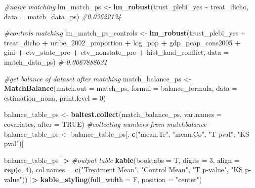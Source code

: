 \documentclass[
]{article}
\newenvironment{Shaded}{\begin{snugshade}}{\end{snugshade}}
\newcommand{\AttributeTok}[1]{\textcolor[rgb]{0.13,0.29,0.53}{#1}}
\newcommand{\CommentTok}[1]{\textcolor[rgb]{0.56,0.35,0.01}{\textit{#1}}}
\newcommand{\ConstantTok}[1]{\textcolor[rgb]{0.56,0.35,0.01}{#1}}
\newcommand{\DecValTok}[1]{\textcolor[rgb]{0.00,0.00,0.81}{#1}}
\newcommand{\FunctionTok}[1]{\textcolor[rgb]{0.13,0.29,0.53}{\textbf{#1}}}
\newcommand{\NormalTok}[1]{#1}
\newcommand{\OtherTok}[1]{\textcolor[rgb]{0.56,0.35,0.01}{#1}}
\newcommand{\SpecialCharTok}[1]{\textcolor[rgb]{0.81,0.36,0.00}{\textbf{#1}}}
\newcommand{\StringTok}[1]{\textcolor[rgb]{0.31,0.60,0.02}{#1}}
\begin{document}
\begin{Shaded}
\begin{Highlighting}[]
\CommentTok{\#naive matching}
\NormalTok{lm\_match\_ps }\OtherTok{\textless{}{-}} \FunctionTok{lm\_robust}\NormalTok{(trust\_plebi\_yes }\SpecialCharTok{\textasciitilde{}}\NormalTok{ treat\_dicho, }\AttributeTok{data =}\NormalTok{ match\_data\_ps) }\CommentTok{\#0.03622134}

\CommentTok{\#controls matching}
\NormalTok{lm\_match\_ps\_controls }\OtherTok{\textless{}{-}} \FunctionTok{lm\_robust}\NormalTok{(trust\_plebi\_yes }\SpecialCharTok{\textasciitilde{}}\NormalTok{ treat\_dicho }\SpecialCharTok{+}\NormalTok{ uribe\_2002\_proportion }\SpecialCharTok{+}\NormalTok{ log\_pop }\SpecialCharTok{+}\NormalTok{ gdp\_pcap\_cons2005 }\SpecialCharTok{+}\NormalTok{  gini }\SpecialCharTok{+}\NormalTok{ etv\_state\_pre }\SpecialCharTok{+}\NormalTok{ etv\_nonstate\_pre }\SpecialCharTok{+}\NormalTok{ hist\_land\_conflict, }\AttributeTok{data =}\NormalTok{ match\_data\_ps) }\CommentTok{\#{-}0.0067888631}
\end{Highlighting}
\end{Shaded}

\begin{Shaded}
\begin{Highlighting}[]
\CommentTok{\#get balance of dataset after matching}
\NormalTok{match\_balance\_ps }\OtherTok{\textless{}{-}} \FunctionTok{MatchBalance}\NormalTok{(}\AttributeTok{match.out =}\NormalTok{ match\_ps, }
                                 \AttributeTok{formul =}\NormalTok{ balance\_formula, }
                                 \AttributeTok{data =}\NormalTok{ estimation\_nona, }
                                 \AttributeTok{print.level =} \DecValTok{0}\NormalTok{)}

\NormalTok{balance\_table\_ps }\OtherTok{\textless{}{-}} \FunctionTok{baltest.collect}\NormalTok{(match\_balance\_ps, }\AttributeTok{var.names =}\NormalTok{ covariates, }\AttributeTok{after =} \ConstantTok{TRUE}\NormalTok{) }\CommentTok{\#collecting numbers from matchbalance}
\NormalTok{balance\_table\_ps }\OtherTok{\textless{}{-}}\NormalTok{ balance\_table\_ps[, }\FunctionTok{c}\NormalTok{(}\StringTok{"mean.Tr"}\NormalTok{, }\StringTok{"mean.Co"}\NormalTok{, }\StringTok{"T pval"}\NormalTok{, }\StringTok{"KS pval"}\NormalTok{)]}

\NormalTok{balance\_table\_ps }\SpecialCharTok{|\textgreater{}} \CommentTok{\#output table}
  \FunctionTok{kable}\NormalTok{(}\AttributeTok{booktabs =}\NormalTok{ T, }\AttributeTok{digits =} \DecValTok{3}\NormalTok{, }\AttributeTok{align =} \FunctionTok{rep}\NormalTok{(}\StringTok{\textquotesingle{}c\textquotesingle{}}\NormalTok{, }\DecValTok{4}\NormalTok{),}
        \AttributeTok{col.names =} \FunctionTok{c}\NormalTok{(}\StringTok{"Treatment Mean"}\NormalTok{, }\StringTok{"Control Mean"}\NormalTok{, }\StringTok{"T p{-}value"}\NormalTok{, }\StringTok{"KS p{-}value"}\NormalTok{)) }\SpecialCharTok{|\textgreater{}} 
  \FunctionTok{kable\_styling}\NormalTok{(}\AttributeTok{full\_width =}\NormalTok{ F, }\AttributeTok{position =} \StringTok{"center"}\NormalTok{)}
\end{Highlighting}
\end{Shaded}
\end{document}
